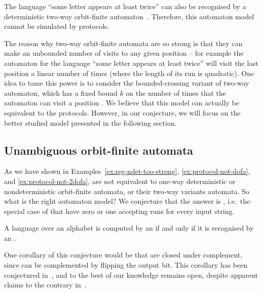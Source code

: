 \begin{myexample}\label{ex:protocol-not-2dofa}
    The language ``some letter appears at least twice'' can also be recognised
    by a deterministic two-way orbit-finite automaton~\cite[Example
    18]{bojanczyk_slightly}. Therefore, this automaton model cannot be
    simulated by protocols.

    The reason why two-way orbit-finite automata are so strong is that they can
    make an unbounded number of visits to any given position -- for example the
    automaton for the language ``some letter appears at least twice'' will
    visit the last position a linear number of times (where the length of its run is
    quadratic). One idea to tame this power is to consider the bounded-crossing
    variant of two-way automaton, which has a fixed bound $k$ on the number of
    times that the automaton can visit a position \cite[p.~92]{neven2003power}.
    We believe that this model can actually be equivalent to the protocols.
    However, in our conjecture, we will focus on the better studied model
    presented in the following section.
\end{myexample}

\subsection{Unambiguous orbit-finite automata}
\label{sec:unambiguous-orbit-finite-automata}
\AP
As we have shown in Examples~\ref{ex:reg-ndet-too-strong}, \ref{ex:protocol-not-dofa},
and \ref{ex:protocol-not-2dofa},
 are not equivalent to one-way deterministic or
nondeterministic orbit-finite automata, or their two-way variants automata. So
what is the right automaton model?  We conjecture that the answer is
, i.e.~the special case of
 that have zero or one accepting runs for
every input string.

\begin{conjecture}
    \label{conj:protocols-unambiguous}
    A language over an  alphabet is computed by 
    an  if and only if it is recognised by an .
\end{conjecture}

One corollary of this conjecture would be that  are closed under complement, since  can
be complemented by flipping the output bit. This corollary has been conjectured
in~\cite[p.9]{colcombet2012forms}, and to the best of our knowledge remains
open, despite apparent claims to the contrary in~\cite[Footnote
5]{colcombet2015unambiguity}.

